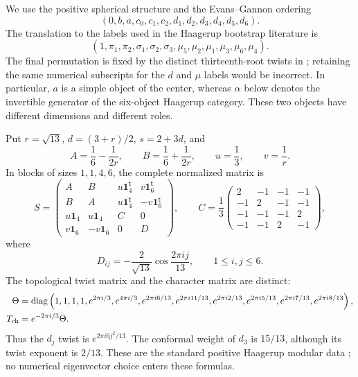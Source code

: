 \documentclass[11pt,a4paper]{article}
\theoremstyle{definition}
\begin{document}
We use the positive spherical structure and the Evans--Gannon ordering
\[
 (0,b,a,c_0,c_1,c_2,d_1,d_2,d_3,d_4,d_5,d_6).
\]
The translation to the labels used in the Haagerup bootstrap literature is
\[
 (1,\pi_1,\pi_2,\sigma_1,\sigma_2,\sigma_3,
   \mu_5,\mu_2,\mu_1,\mu_3,\mu_6,\mu_4).
\]
The final permutation is fixed by the distinct thirteenth-root twists
in \cite[arXiv version~2, Eq.~(30)]{AHKZ}; retaining the same numerical subscripts for
the $d$ and $\mu$ labels would be incorrect.
In particular, $a$ is a simple object of the center, whereas $\alpha$
below denotes the invertible generator of the six-object Haagerup
category. These two objects have different dimensions and different roles.

Put $r=\sqrt{13}$, $d=(3+r)/2$, $s=2+3d$, and
\[
 A=\frac16-\frac1{2r},\qquad B=\frac16+\frac1{2r},\qquad
 u=\frac13,\qquad v=\frac1r.
\]
In blocks of sizes $1,1,4,6$, the complete normalized matrix is
\begin{equation}
 S=\begin{pmatrix}
 A&B&u\mathbf1_4^{\mathsf t}&v\mathbf1_6^{\mathsf t}\\
 B&A&u\mathbf1_4^{\mathsf t}&-v\mathbf1_6^{\mathsf t}\\
 u\mathbf1_4&u\mathbf1_4&C&0\\
 v\mathbf1_6&-v\mathbf1_6&0&D
 \end{pmatrix},
 \qquad
 C=\frac13\begin{pmatrix}
 2&-1&-1&-1\\-1&2&-1&-1\\-1&-1&-1&2\\-1&-1&2&-1
 \end{pmatrix},
 \label{eq:physics-S}
\end{equation}
where
\begin{equation}
 D_{ij}=-\frac2{\sqrt{13}}\cos\frac{2\pi ij}{13},
 \qquad 1\leq i,j\leq6.
 \label{eq:physics-Sd}
\end{equation}
The topological twist matrix and the character matrix are distinct:
\begin{align}
 \Theta&=\operatorname{diag}\left(
 1,1,1,1,e^{2\pi i/3},e^{4\pi i/3},
 e^{2\pi i6/13},e^{2\pi i11/13},e^{2\pi i2/13},
 e^{2\pi i5/13},e^{2\pi i7/13},e^{2\pi i8/13}\right),\\
 T_{\rm ch}&=e^{-2\pi i/3}\Theta.
 \label{eq:physics-T}
\end{align}
Thus the $d_j$ twist is $e^{2\pi i6j^2/13}$. The conformal weight of
$d_3$ is $15/13$, although its twist exponent is $2/13$.
These are the standard positive Haagerup modular data
\cite{EG}; no numerical eigenvector choice enters these formulas.
\end{document}
